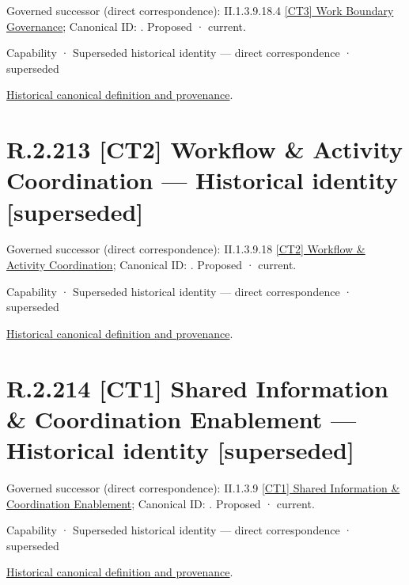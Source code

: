 {\small Governed successor (direct correspondence): II.1.3.9.18.4 \hyperref[element:35b66a0b38db4568849ecb842ffdcbf3]{[CT3] Work Boundary Governance}; Canonical ID: \texttt{}. Proposed · current.}\par
\label{element:b4d14abf930a4230a7f5b93e9ce3df91}
{\small Capability · Superseded historical identity — direct correspondence · superseded}\par
\href{../../../../continuum/strategy/capability/b4d14abf930a4230a7f5b93e9ce3df91.md}{Historical canonical definition and provenance}.\par
\section*{R.2.213 [CT2] Workflow \& Activity Coordination — Historical identity [superseded]}
\label{navigation:R.2.213}

{\small Governed successor (direct correspondence): II.1.3.9.18 \hyperref[element:c724f3d38bfa4567983a11ad22095d61]{[CT2] Workflow \& Activity Coordination}; Canonical ID: \texttt{}. Proposed · current.}\par
\label{element:4422d865978c4353ad575759c6026d27}
{\small Capability · Superseded historical identity — direct correspondence · superseded}\par
\href{../../../../continuum/strategy/capability/4422d865978c4353ad575759c6026d27.md}{Historical canonical definition and provenance}.\par
\section*{R.2.214 [CT1] Shared Information \& Coordination Enablement — Historical identity [superseded]}
\label{navigation:R.2.214}

{\small Governed successor (direct correspondence): II.1.3.9 \hyperref[element:0062fcacae1740988b6be2bda2aa1674]{[CT1] Shared Information \& Coordination Enablement}; Canonical ID: \texttt{}. Proposed · current.}\par
\label{element:eeabb9c3c526404cbe4302906560fa7e}
{\small Capability · Superseded historical identity — direct correspondence · superseded}\par
\href{../../../../continuum/strategy/capability/eeabb9c3c526404cbe4302906560fa7e.md}{Historical canonical definition and provenance}.\par
